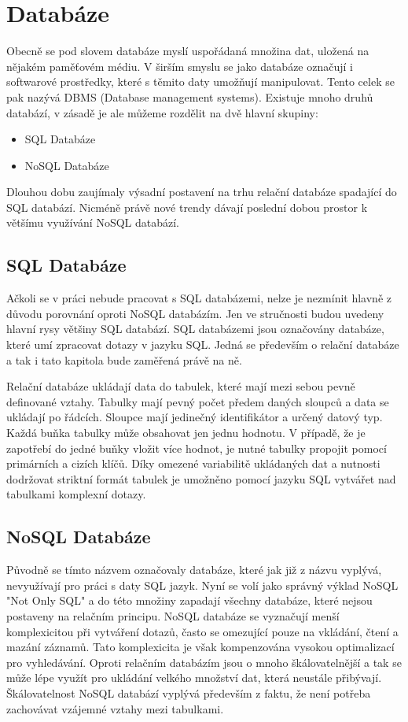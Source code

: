 \documentclass[thesis=M,czech]{FITthesis}[2012/06/26]
\begin{document}
\section{Databáze}
Obecně se pod slovem databáze myslí uspořádaná množina dat, uložená na nějakém paměťovém médiu. V širším smyslu se jako databáze označují i softwarové prostředky, které s těmito daty umožňují manipulovat. Tento celek se pak nazývá DBMS (Database management systems). Existuje mnoho druhů databází, v zásadě je ale můžeme rozdělit na dvě hlavní skupiny:

\begin{itemize}
\item SQL Databáze
\item NoSQL Databáze
\end{itemize}

Dlouhou dobu zaujímaly výsadní postavení na trhu relační databáze spadající do SQL databází. Nicméně právě nové trendy dávají poslední dobou prostor k většímu využívání NoSQL databází.

\subsection{SQL Databáze}
Ačkoli se v práci nebude pracovat s SQL databázemi, nelze je nezmínit hlavně z důvodu porovnání oproti NoSQL databázím. Jen ve stručnosti budou uvedeny hlavní rysy většiny SQL databází. SQL databázemi jsou označovány databáze, které umí zpracovat dotazy v jazyku SQL. Jedná se především o relační databáze a tak i tato kapitola bude zaměřená právě na ně.

Relační databáze ukládají data do tabulek, které mají mezi sebou pevně definované vztahy. Tabulky mají pevný počet předem daných sloupců a data se ukládají po řádcích. Sloupce mají jedinečný identifikátor a určený datový typ. Každá buňka tabulky může obsahovat jen jednu hodnotu. V případě, že je zapotřebí do jedné buňky vložit více hodnot, je nutné tabulky propojit pomocí primárních a cizích klíčů. Díky omezené variabilitě ukládaných dat a nutnosti dodržovat striktní formát tabulek je umožněno pomocí jazyku SQL vytvářet nad tabulkami komplexní dotazy.


\subsection{NoSQL Databáze}
Původně se tímto názvem označovaly databáze, které jak již z názvu vyplývá, nevyužívají pro práci s daty SQL jazyk. Nyní se volí jako správný výklad NoSQL "Not Only SQL" a do této množiny zapadají všechny databáze, které nejsou postaveny na relačním principu.  NoSQL databáze se vyznačují menší komplexicitou při vytváření dotazů, často se omezující pouze na vkládání, čtení a mazání záznamů. Tato komplexicita je však kompenzována vysokou optimalizací pro vyhledávání. Oproti relačním databázím jsou o mnoho škálovatelnější a tak se může lépe využít pro ukládání velkého množství dat, která neustále přibývají. Škálovatelnost NoSQL databází vyplývá především z faktu, že není potřeba zachovávat vzájemné vztahy mezi tabulkami.
\end{document}
